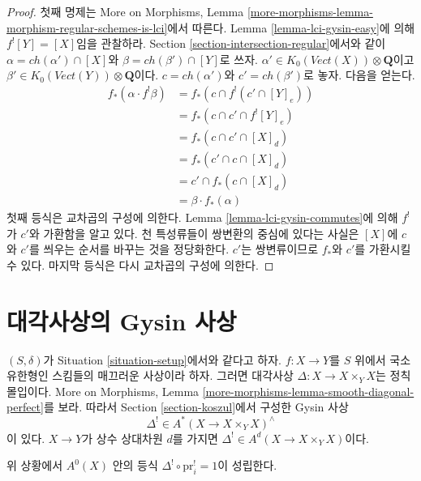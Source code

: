 \begin{proof}
첫째 명제는 More on Morphisms, Lemma
\ref{more-morphisms-lemma-morphism-regular-schemes-is-lci}에서 따른다.
Lemma \ref{lemma-lci-gysin-easy}에 의해 $f^![Y] = [X]$임을 관찰하라.
Section \ref{section-intersection-regular}에서와 같이
$\alpha = ch(\alpha') \cap [X]$와 $\beta = ch(\beta') \cap [Y]$로 쓰자.
$\alpha' \in K_0(\textit{Vect}(X)) \otimes \mathbf{Q}$이고
$\beta' \in K_0(\textit{Vect}(Y)) \otimes \mathbf{Q}$이다.
$c = ch(\alpha')$와 $c' = ch(\beta')$로 놓자. 다음을 얻는다.
\begin{align*}
f_*(\alpha \cdot f^!\beta)
& =
f_*(c \cap f^!(c' \cap [Y]_e)) \\
& =
f_*(c \cap c' \cap f^![Y]_e) \\
& =
f_*(c \cap c' \cap [X]_d) \\
& =
f_*(c' \cap c \cap [X]_d) \\
& =
c' \cap f_*(c \cap [X]_d) \\
& =
\beta \cdot f_*(\alpha)
\end{align*}
첫째 등식은 교차곱의 구성에 의한다. Lemma
\ref{lemma-lci-gysin-commutes}에 의해 $f^!$가 $c'$와 가환함을 알고
있다. 천 특성류들이 쌍변환의 중심에 있다는 사실은 $[X]$에 $c$와
$c'$를 씌우는 순서를 바꾸는 것을 정당화한다. $c'$는 쌍변류이므로
$f_*$와 $c'$를 가환시킬 수 있다. 마지막 등식은 다시 교차곱의 구성에
의한다.
\end{proof}













\section{대각사상의 Gysin 사상}
\label{section-gysin-for-diagonal}

\noindent
$(S, \delta)$가 Situation \ref{situation-setup}에서와 같다고 하자.
$f : X \to Y$를 $S$ 위에서 국소 유한형인 스킴들의 매끄러운 사상이라
하자. 그러면 대각사상 $\Delta : X \longrightarrow X \times_Y X$는
정칙 몰입이다. More on Morphisms, Lemma
\ref{more-morphisms-lemma-smooth-diagonal-perfect}를 보라. 따라서 Section
\ref{section-koszul}에서 구성한 Gysin 사상
$$
\Delta^! \in A^*(X \to X \times_Y X)^\wedge
$$
이 있다. $X \to Y$가 상수 상대차원 $d$를 가지면
$\Delta^! \in A^d(X \to X \times_Y X)$이다.

\begin{lemma}
\label{lemma-diagonal-identity}
위 상황에서 $A^0(X)$ 안의 등식
$\Delta^! \circ \text{pr}_i^! = 1$이 성립한다.
\end{lemma}

